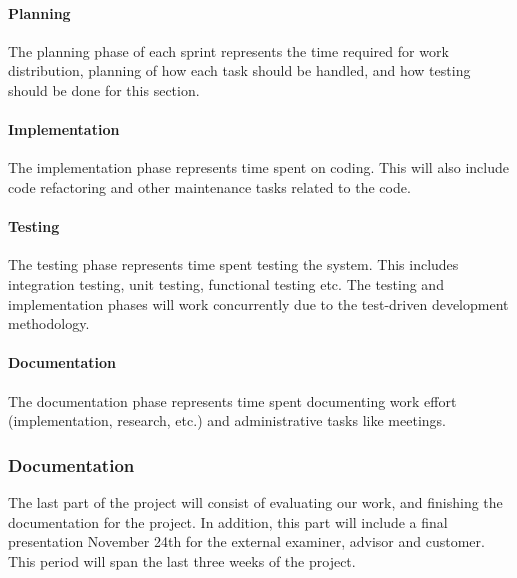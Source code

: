 \paragraph{Planning} The planning phase of each sprint represents the time
required for work distribution, planning of how each task should be handled,
and how testing should be done for this section.

\paragraph{Implementation} The implementation phase represents time spent on coding.
This will also include code refactoring and other maintenance tasks
related to the code.

\paragraph{Testing} The testing phase represents time spent testing the system.
This includes integration testing, unit testing, functional testing etc.
The testing and implementation phases will work concurrently due to the
test-driven development methodology.

\paragraph{Documentation} The documentation phase represents time spent
documenting work effort (implementation, research, etc.) and administrative
tasks like meetings.

\subsubsection{Documentation}
The last part of the project will consist of evaluating our work, and finishing the
documentation for the project. In addition, this part will include a final
presentation November 24th for the external examiner, advisor and customer. This
period will span the last three weeks of the project.  
